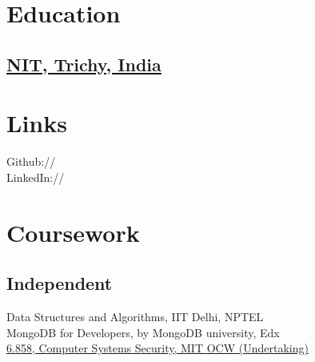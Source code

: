 \documentclass[]{deedy-resume-openfont}
\begin{document}
%
%

%
%



%
%

\begin{minipage}[t]{0.33\textwidth} 


\section{Education} 

\subsection {\href{http://www.nitt.edu/}{NIT, Trichy, India}}


\section{Links} 
Github:// \href{https://github.com/tushar-rishav}{} \\
LinkedIn://  \href{https://www.linkedin.com/in/tusharrishav}{}
\sectionsep


\section{Coursework} 
\subsection{Independent}
Data Structures and Algorithms, IIT Delhi, NPTEL\\
MongoDB for Developers, by MongoDB university, Edx\\
{\href{http://ocw.mit.edu/courses/electrical-engineering-and-computer-science/6-858-computer-systems-security-fall-2014/}{6.858, Computer Systems Security, MIT OCW (Undertaking)}}
\sectionsep


\end{minipage}
\end{document}
